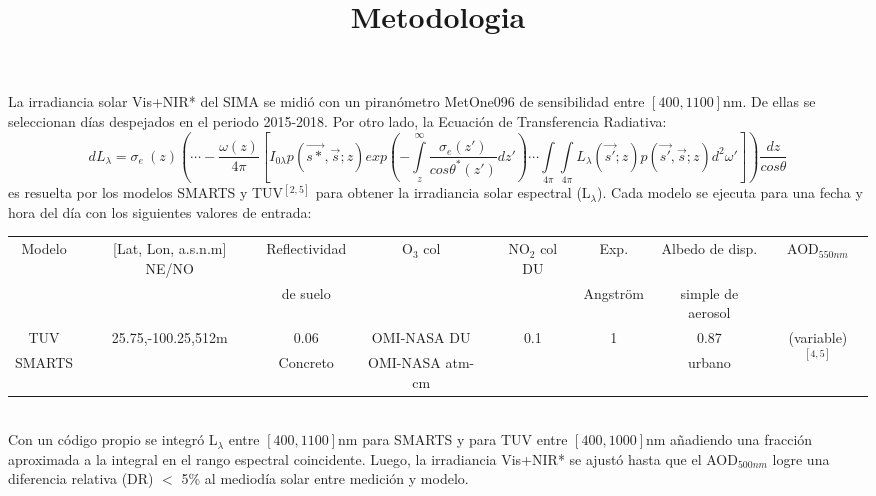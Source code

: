 \title{Metodologia}
\begin{minipage}{0.81\linewidth}
    La irradiancia solar Vis+NIR* del SIMA se midió con un piranómetro MetOne096 de sensibilidad entre $\left[400,1100\right]$nm. De ellas se seleccionan días despejados en el periodo 2015-2018. Por otro lado, la Ecuación de Transferencia Radiativa:
    \begin{equation*}
        dL_{\lambda}=\sigma_e \ \left(z\right) \left(\cdots - \frac{\omega\left(z\right)}{4\pi} \left[I_{0\lambda}p\left(\vec{s*},\vec{s};z \right)exp\left(-\int\limits_z^\infty \frac{\sigma_e(z')}{cos\theta^*(z')}dz' \right)\cdots \int\limits_{4\pi}\int\limits_{4\pi} L_{\lambda}(\vec{s'};z)p(\vec{s'},\vec{s};z)d^2\omega' \right]\right)\frac{dz}{cos\theta}
    \end{equation*}
    es resuelta por los modelos SMARTS y TUV$^{\left[2,5\right]}$ para obtener la irradiancia solar espectral (L$_\lambda$). Cada modelo se ejecuta para una fecha y hora del día con los siguientes valores de entrada:

    \changefontsizes{9.5pt}
    \begin{tabular}{|c|c|c|c|c|c|c|c|}
        \hline
        Modelo & [Lat, Lon, a.s.n.m] NE/NO           & Reflectividad & O$_3$ col       & NO$_2$ col DU        & Exp.               & Albedo de disp.   & AOD$_{550nm}$                                     \\
               &                                     & de suelo      &                 &                      & Angström           & simple de aerosol &                                                   \\ \hline
        TUV    & \multirow{2}{*}{25.75,-100.25,512m} & 0.06          & OMI-NASA DU     & \multirow{2}{*}{0.1} & \multirow{2}{*}{1} & 0.87              & \multirow{2}{*}{(variable)$^{\left[4,5 \right]}$} \\ \cline{1-1}
        SMARTS &                                     & Concreto      & OMI-NASA atm-cm &                      &                    & urbano            &                                                   \\ \hline
    \end{tabular}\vspace{0.2cm}\\
    \changefontsizes{12pt}
    Con un código propio se integró L$_\lambda$ entre $\left[400,1100\right]$nm para SMARTS y para TUV entre $\left[400,1000\right]$nm añadiendo una fracción aproximada a la integral en el rango espectral coincidente. Luego, la irradiancia Vis+NIR* se ajustó hasta que el AOD$_{500nm}$ logre una diferencia relativa (DR) $<$ 5\% al mediodía solar entre medición y modelo.
\end{minipage}
\hspace{0.3cm}
\begin{minipage}{0.18\linewidth}
    \centering
\end{minipage}